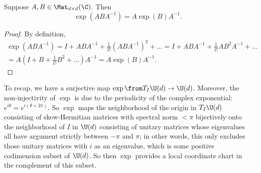 \begin{lemma}\label{lem:exponentiating conjugates}
	Suppose $A,B \in \Mat_{d \times d}(\C)$. Then
	\[
		\exp(ABA^{-1}) = A \exp(B) A^{-1}.
	\]
\end{lemma}

\begin{proof}
	By definition,
	\begin{multline*}
		\exp(ABA^{-1}) = I + ABA^{-1} + \frac{1}{2!} (ABA^{-1})^2 + \dots  = I + ABA^{-1} + \frac{1}{2!} A B^2 A^{-1} + \dots \\
		= A \left(I + B + \frac{1}{2!} B^2 + \dots \right) A^{-1} = A \exp(B)A^{-1}.
	\end{multline*}
\end{proof}

To recap, we have a surjective map $\exp \from T_I \U(d) \to \U(d)$. Moreover, the non-injectivity of $\exp$ is due to the periodicity of the complex exponential: $e^{i \theta} = e^{i(\theta + 2\pi)}$. So $\exp$ maps the neighborhood of the origin in $T_I \U(d)$ consisting of skew-Hermitian matrices with spectral norm $< \pi$ bijectively onto the neighborhood of $I$ in $\U(d)$ consisting of unitary matrices whose eigenvalues all have argument strictly between $-\pi$ and $\pi$; in other words, this only excludes those unitary matrices with $i$ as an eigenvalue, which is some positive codimension subset of $\U(d)$. So then $\exp$ provides a local coordinate chart in the complement of this subset.